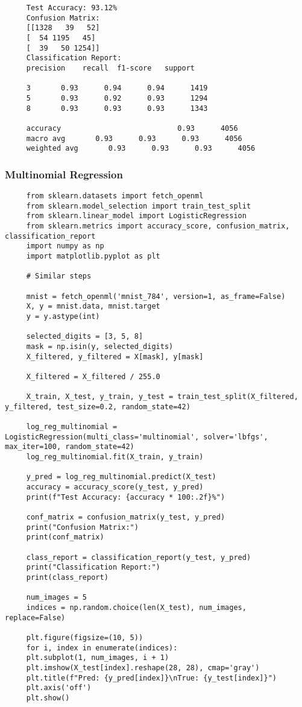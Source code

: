 \documentclass[letterpaper]{article}
\begin{document}
	\begin{minipage}{\linewidth}
	\begin{Verbatim}
     Test Accuracy: 93.12%
     Confusion Matrix:
     [[1328   39   52]
     [  54 1195   45]
     [  39   50 1254]]
     Classification Report:
     precision    recall  f1-score   support
     
     3       0.93      0.94      0.94      1419
     5       0.93      0.92      0.93      1294
     8       0.93      0.93      0.93      1343
     
     accuracy                           0.93      4056
     macro avg       0.93      0.93      0.93      4056
     weighted avg       0.93      0.93      0.93      4056
	\end{Verbatim}
\end{minipage}

	\subsubsection{Multinomial Regression}
	\begin{lstlisting}
     from sklearn.datasets import fetch_openml
     from sklearn.model_selection import train_test_split
     from sklearn.linear_model import LogisticRegression
     from sklearn.metrics import accuracy_score, confusion_matrix, classification_report
     import numpy as np
     import matplotlib.pyplot as plt
     
     # Similar steps
     
     mnist = fetch_openml('mnist_784', version=1, as_frame=False)
     X, y = mnist.data, mnist.target
     y = y.astype(int)
     
     selected_digits = [3, 5, 8]
     mask = np.isin(y, selected_digits)
     X_filtered, y_filtered = X[mask], y[mask]
     
     X_filtered = X_filtered / 255.0
     
     X_train, X_test, y_train, y_test = train_test_split(X_filtered, y_filtered, test_size=0.2, random_state=42)
     
     log_reg_multinomial = LogisticRegression(multi_class='multinomial', solver='lbfgs', max_iter=100, random_state=42)
     log_reg_multinomial.fit(X_train, y_train)
     
     y_pred = log_reg_multinomial.predict(X_test)
     accuracy = accuracy_score(y_test, y_pred)
     print(f"Test Accuracy: {accuracy * 100:.2f}%")
     
     conf_matrix = confusion_matrix(y_test, y_pred)
     print("Confusion Matrix:")
     print(conf_matrix)
     
     class_report = classification_report(y_test, y_pred)
     print("Classification Report:")
     print(class_report)
     
     num_images = 5
     indices = np.random.choice(len(X_test), num_images, replace=False)
     
     plt.figure(figsize=(10, 5))
     for i, index in enumerate(indices):
     plt.subplot(1, num_images, i + 1)
     plt.imshow(X_test[index].reshape(28, 28), cmap='gray')
     plt.title(f"Pred: {y_pred[index]}\nTrue: {y_test[index]}")
     plt.axis('off')
     plt.show()
	\end{lstlisting}
\end{document}
